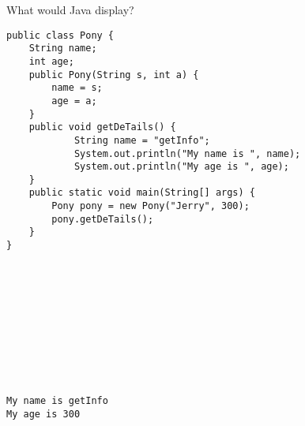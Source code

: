 \question What would Java display? 
\begin{lstlisting}
public class Pony {
    String name;
    int age;
    public Pony(String s, int a) {
        name = s;
        age = a;
    }
    public void getDeTails() {
            String name = "getInfo";
            System.out.println("My name is ", name);
            System.out.println("My age is ", age);
    }
    public static void main(String[] args) {
        Pony pony = new Pony("Jerry", 300);
        pony.getDeTails();
    }
}











\end{lstlisting}

\begin{solution}[1.5in]
\begin{verbatim}
My name is getInfo
My age is 300
\end{verbatim}
\end{solution}
